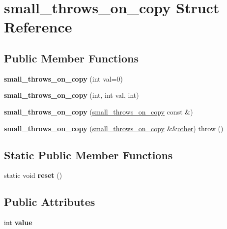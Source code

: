 \hypertarget{structsmall__throws__on__copy}{}\section{small\+\_\+throws\+\_\+on\+\_\+copy Struct Reference}
\label{structsmall__throws__on__copy}
\subsection*{Public Member Functions}
\begin{DoxyCompactItemize}
\item 
\mbox{\label{structsmall__throws__on__copy_a1ceefbd4caea7dfc6b7b0dc3769081dc}} 
{\bfseries small\+\_\+throws\+\_\+on\+\_\+copy} (int val=0)
\item 
\mbox{\label{structsmall__throws__on__copy_a6daa82886dd741da515f9418438b7499}} 
{\bfseries small\+\_\+throws\+\_\+on\+\_\+copy} (int, int val, int)
\item 
\mbox{\label{structsmall__throws__on__copy_a327fa556a6955bc618415265d83aa5ac}} 
{\bfseries small\+\_\+throws\+\_\+on\+\_\+copy} (\mbox{\hyperlink{structsmall__throws__on__copy}{small\+\_\+throws\+\_\+on\+\_\+copy}} const \&)
\item 
\mbox{\label{structsmall__throws__on__copy_ad4c5f3b7fdb0493f90c30e3e60d46bc7}} 
{\bfseries small\+\_\+throws\+\_\+on\+\_\+copy} (\mbox{\hyperlink{structsmall__throws__on__copy}{small\+\_\+throws\+\_\+on\+\_\+copy}} \&\&\mbox{\hyperlink{structother}{other}})  throw ()
\end{DoxyCompactItemize}
\subsection*{Static Public Member Functions}
\begin{DoxyCompactItemize}
\item 
\mbox{\label{structsmall__throws__on__copy_ab6bd975db72c238a097e12681b3ba0b5}} 
static void {\bfseries reset} ()
\end{DoxyCompactItemize}
\subsection*{Public Attributes}
\begin{DoxyCompactItemize}
\item 
\mbox{\label{structsmall__throws__on__copy_ad0ebc831fd2f54d6153f2016796d62aa}} 
int {\bfseries value}
\end{DoxyCompactItemize}
